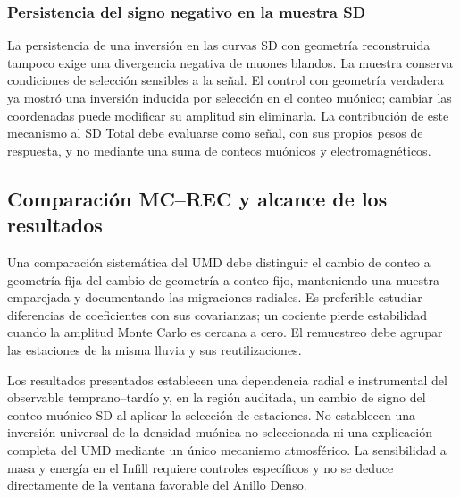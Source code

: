 \subsubsection{Persistencia del signo negativo en la muestra SD}

La persistencia de una inversión en las curvas SD con geometría reconstruida tampoco exige una divergencia negativa de muones blandos. La muestra conserva condiciones de selección sensibles a la señal. El control con geometría verdadera ya mostró una inversión inducida por selección en el conteo muónico; cambiar las coordenadas puede modificar su amplitud sin eliminarla. La contribución de este mecanismo al SD Total debe evaluarse como señal, con sus propios pesos de respuesta, y no mediante una suma de conteos muónicos y electromagnéticos.

\subsection{Comparación MC--REC y alcance de los resultados}
\label{subsec:comparacion_performance_umd}

Una comparación sistemática del UMD debe distinguir el cambio de conteo a geometría fija del cambio de geometría a conteo fijo, manteniendo una muestra emparejada y documentando las migraciones radiales. Es preferible estudiar diferencias de coeficientes con sus covarianzas; un cociente pierde estabilidad cuando la amplitud Monte Carlo es cercana a cero. El remuestreo debe agrupar las estaciones de la misma lluvia y sus reutilizaciones.

Los resultados presentados establecen una dependencia radial e instrumental del observable temprano--tardío y, en la región auditada, un cambio de signo del conteo muónico SD al aplicar la selección de estaciones. No establecen una inversión universal de la densidad muónica no seleccionada ni una explicación completa del UMD mediante un único mecanismo atmosférico. La sensibilidad a masa y energía en el Infill requiere controles específicos y no se deduce directamente de la ventana favorable del Anillo Denso.


\newpage
